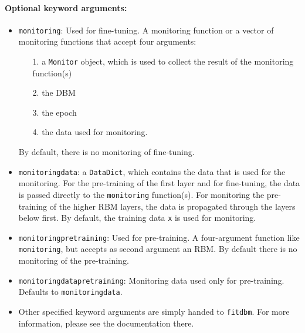 \paragraph*{Optional keyword arguments:}
\begin{itemize}
\item \texttt{monitoring}: Used for fine-tuning. A monitoring function or a vector of monitoring functions that accept four arguments:

\begin{itemize}
\item[1. ] a \texttt{Monitor} object, which is used to collect the result of the monitoring function(s)


\item[2. ] the DBM


\item[3. ] the epoch


\item[4. ] the data used for monitoring.

\end{itemize}
By default, there is no monitoring of fine-tuning.


\item \texttt{monitoringdata}: a \texttt{DataDict}, which contains the data that is used for the  monitoring. For the pre-training of the first layer and for fine-tuning,  the data is passed directly to the \texttt{monitoring} function(s).  For monitoring the pre-training of the higher RBM layers,  the data is propagated through the layers below first.  By default, the training data \texttt{x} is used for monitoring.


\item \texttt{monitoringpretraining}: Used for pre-training. A four-argument function like  \texttt{monitoring}, but accepts as second argument an RBM.  By default there is no monitoring of the pre-training.


\item \texttt{monitoringdatapretraining}: Monitoring data used only for pre-training.  Defaults to \texttt{monitoringdata}.


\item Other specified keyword arguments are simply handed to \texttt{fitdbm}. For more information, please see the documentation there.

\end{itemize}
